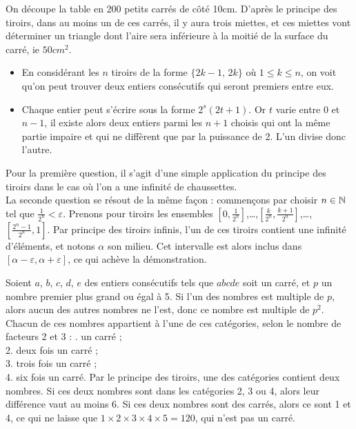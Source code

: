 \begin{sol}
On découpe la table en 200 petits carrés de côté 10cm. D'après le principe des tiroirs, dans au moins un de ces carrés, il y aura trois miettes, et ces miettes vont déterminer un triangle dont l'aire sera inférieure à la moitié de la surface du carré, ie $50cm^2$.
\end{sol}

\begin{sol}
\begin{itemize}
    \item En considérant les $n$ tiroirs de la forme $\{2k-1, \, 2k\}$ où $1 \le k \le n$, on voit qu'on peut trouver deux entiers consécutifs qui seront premiers entre eux.

    \item Chaque entier peut s'écrire sous la forme $2^s(2t+1)$. Or $t$ varie entre $0$ et $n-1$, il existe alors deux entiers parmi les $n + 1$ choisis qui ont la même partie impaire et qui ne diffèrent que par la puissance de 2. L'un divise donc l'autre.
\end{itemize}
\end{sol}


\begin{sol}
Pour la première question, il s'agit d'une simple application du principe des tiroirs dans le cas où l'on a une infinité de chaussettes.\\
La seconde question se résout de la même façon : commençons par choisir $n\in\mathbb N$ tel que $\frac{1}{2^n}<\varepsilon$. Prenons pour tiroirs les ensembles $\left[0,\frac1{2^n}\right]$,\dots,$\left[\frac{k}{2^n},\frac{k+1}{2^n}\right]$,\dots,$\left[\frac{2^n-1}{2^n},1\right]$. Par principe des tiroirs infinis, l'un de ces tiroirs contient une infinité d'éléments, et notons $\alpha$ son milieu. Cet intervalle est alors inclus dans $[\alpha-\varepsilon,\alpha+\varepsilon]$, ce qui achève la démonstration.
\end{sol}

\begin{sol}
Soient $a$, $b$, $c$, $d$, $e$ des entiers consécutifs tels que $abcde$ soit un carré, et $p$ un nombre premier plus grand ou égal à 5. Si l’un des nombres est multiple de $p$, alors aucun des autres nombres ne l’est, donc ce nombre est multiple de $p^2$.
\smallskip
\newline
Chacun de ces nombres appartient à l’une de ces catégories, selon le nombre de facteurs 2 et 3 :
. un carré ;\\
2. deux fois un carré ;\\
3. trois fois un carré ;\\
4. six fois un carré.
\smallskip
\newline
Par le principe des tiroirs, une des catégories contient deux nombres. Si ces deux nombres sont dans les catégories 2, 3 ou 4, alors leur différence vaut au moins 6. 
\newline
Si ces deux nombres sont des carrés, alors ce sont 1 et 4, ce qui ne laisse que $1 \times 2 \times 3 \times 4 \times 5 = 120$, qui n’est pas un carré.
\end{sol}

